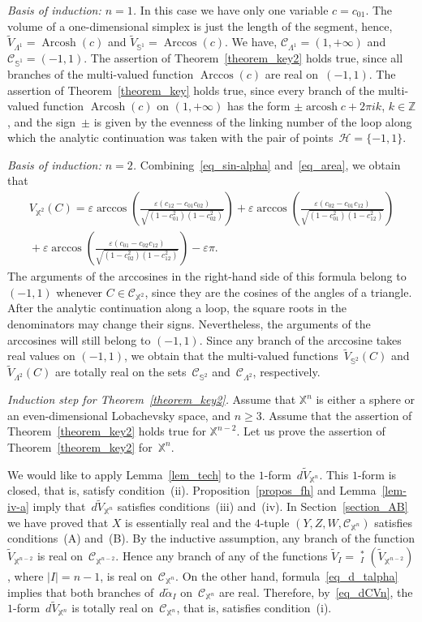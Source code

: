 \documentclass[reqno,tbtags,12pt]{amsart}
\numberwithin{equation}{section}
\newcommand{\CH}{\mathcal{H}}
\newcommand{\CC}{\mathcal{C}}
\newcommand{\Z}{\mathbb{Z}}
\newcommand{\X}{\mathbb{X}}
\newcommand{\bS}{\mathbb{S}}
\newcommand{\tV}{\widetilde{V}}
\newcommand{\talpha}{\widetilde{\alpha}}
\newcommand{\tpr}{\mathop{\widetilde{\mathrm{pr}}}\nolimits}
\newcommand{\arcosh}{\mathop{\mathrm{arcosh}}\nolimits}
\newcommand{\Arcosh}{\mathop{\mathrm{Arcosh}}\nolimits}
\newcommand{\Arccos}{\mathop{\mathrm{Arccos}}\nolimits}
\theoremstyle{definition}
\begin{document}
\textsl{Basis of induction: $n=1$.\/} In this case we have only one variable $c=c_{01}$. The volume of a one-dimensional simplex is just the length of the segment, hence, $\tV_{\Lambda^1}=\Arcosh(c)$ and $\tV_{\bS^1}=\Arccos(c)$. We have,  $\CC_{\Lambda^1}=(1,+\infty)$ and $\CC_{\bS^1}=(-1,1)$. The assertion of Theorem~\ref{theorem_key2} holds true, since all branches of the multi-valued function $\Arccos(c)$ are real on~$(-1,1)$. The assertion of Theorem~\ref{theorem_key} holds true, since every branch of the multi-valued function $\Arcosh(c)$ on $(1,+\infty)$ has the form $\pm\arcosh c+2\pi i k$, $k\in\Z$, and the sign~$\pm$ is given by the  evenness of the linking number of the loop along which the analytic continuation was taken with the pair of points~$\CH=\{-1,1\}$.

\textsl{Basis of induction: $n=2$.\/}
Combining~\eqref{eq_sin-alpha} and~\eqref{eq_area}, we obtain that
\begin{multline*}
V_{\X^2}(C)=\varepsilon\arccos\left(\frac{\varepsilon(c_{12}-c_{01}c_{02})}{\sqrt{(1-c_{01}^2)(1-c_{02}^2)}}\right)+\varepsilon\arccos\left(\frac{\varepsilon(c_{02}-c_{01}c_{12})}{\sqrt{(1-c_{01}^2)(1-c_{12}^2)}}\right)\\{}+\varepsilon\arccos\left(\frac{\varepsilon(c_{01}-c_{02}c_{12})}{\sqrt{(1-c_{02}^2)(1-c_{12}^2)}}\right)-\varepsilon\pi.
\end{multline*}
The arguments of the arccosines in the right-hand side of this formula belong to $(-1,1)$ whenever $C\in\CC_{\X^2}$, since they are the cosines of the angles of a triangle. After the analytic continuation along a loop, the square roots in the denominators may change their signs. Nevertheless, the arguments of the arccosines will still belong to $(-1,1)$. Since any branch of the arccosine takes real values on $(-1,1)$, we obtain that the multi-valued functions~$\tV_{\bS^2}(C)$ and~$\tV_{\Lambda^2}(C)$ are totally real on the sets~$\CC_{\bS^2}$ and~$\CC_{\Lambda^2}$, respectively.

\textsl{Induction step for Theorem~\ref{theorem_key2}.}  Assume that $\X^n$ is either a sphere or an even-dimensional Lobachevsky space, and $n\ge 3$. Assume that the assertion of Theorem~\ref{theorem_key2} holds true for $\X^{n-2}$. Let us prove the assertion of Theorem~\ref{theorem_key2} for~$\X^n$. 


We would like to apply Lemma~\ref{lem_tech} to the $1$-form~$d\tV_{\X^n}$. This $1$-form is closed, that is, satisfy condition~(ii). Proposition~\ref{propos_fh} and Lemma~\ref{lem-iv-a} imply that~$d\tV_{\X^n}$ satisfies conditions~(iii) and~(iv). In Section~\ref{section_AB} we have proved that $X$ is essentially real and the $4$-tuple $(Y,Z,W,\CC_{\X^n})$ satisfies conditions~(A) and~(B). By the inductive assumption, any branch of the function $\tV_{\X^{n-2}}$ is real on~$\CC_{\X^{n-2}}$. Hence any branch of any of the functions $\tV_I=\tpr^*_I(\tV_{\X^{n-2}})$, where $|I|=n-1$, is real  on~$\CC_{\X^{n}}$. On the other hand, formula~\eqref{eq_d_talpha}  implies that both branches of~$d\talpha_I$ on~$\CC_{\X^{n}}$ are real. Therefore, by~\eqref{eq_dCVn}, the $1$-form~$d\tV_{\X^n}$ is totally real on~$\CC_{\X^{n}}$, that is, satisfies condition~(i).
\end{document}

